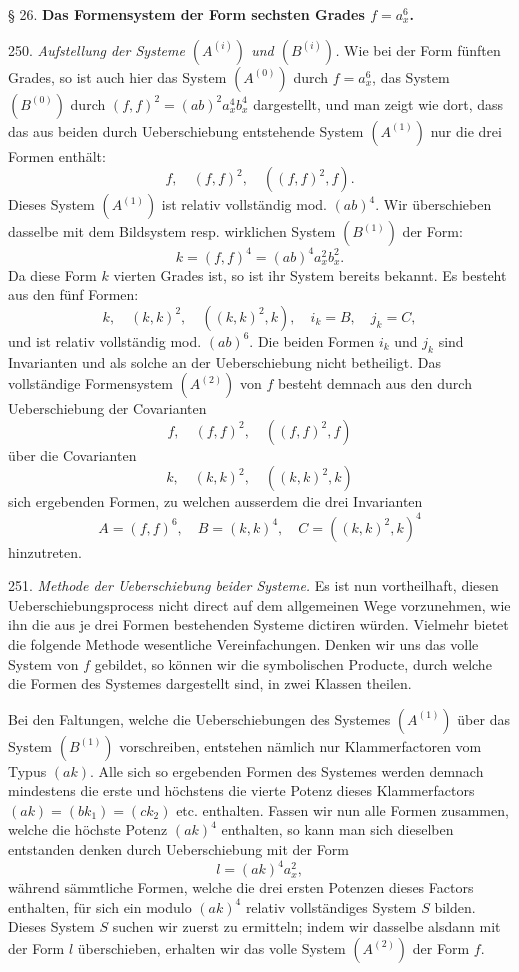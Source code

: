 § 26. \textbf{Das Formensystem der Form sechsten Grades $f = a_x^6$.}

250. \textit{Aufstellung der Systeme $(A^{(i)})$ und $(B^{(i)})$.} Wie bei
der Form fünften Grades, so ist auch hier das System $(A^{(0)})$ durch
$f = a_x^6$, das System $(B^{(0)})$ durch $(f,f)^2 = (ab)^2 a_x^4 b_x^4$
dargestellt, und man zeigt wie dort, dass das aus beiden durch
Ueberschiebung entstehende System $(A^{(1)})$ nur die drei Formen enthält:
\[
f,\quad (f,f)^2,\quad ((f,f)^2, f).
\]
Dieses System $(A^{(1)})$ ist relativ vollständig mod. $(ab)^4$. Wir
überschieben dasselbe mit dem Bildsystem resp. wirklichen System
$(B^{(1)})$ der Form:
\[
k = (f,f)^4 = (ab)^4 a_x^2 b_x^2 .
\]
Da diese Form $k$ vierten Grades ist, so ist ihr System bereits bekannt.
Es besteht aus den fünf Formen:
\[
k,\quad (k,k)^2,\quad ((k,k)^2, k),\quad i_k = B,\quad j_k = C,
\]
und ist relativ vollständig mod. $(ab)^6$. Die beiden Formen $i_k$ und
$j_k$ sind Invarianten und als solche an der Ueberschiebung nicht
betheiligt. Das vollständige Formensystem $(A^{(2)})$ von $f$ besteht
demnach aus den durch Ueberschiebung der Covarianten
\[
f,\quad (f,f)^2,\quad ((f,f)^2, f)
\]
über die Covarianten
\[
k,\quad (k,k)^2,\quad ((k,k)^2, k)
\]
sich ergebenden Formen, zu welchen ausserdem die drei Invarianten
\[
A = (f,f)^6,\quad B = (k,k)^4,\quad C = ((k,k)^2, k)^4
\]
hinzutreten.

251. \textit{Methode der Ueberschiebung beider Systeme.} Es ist nun
vortheilhaft, diesen Ueberschiebungsprocess nicht direct auf dem
allgemeinen Wege vorzunehmen, wie ihn die aus je drei Formen bestehenden
Systeme dictiren würden. Vielmehr bietet die folgende Methode wesentliche
Vereinfachungen. Denken wir uns das volle System von $f$ gebildet, so
können wir die symbolischen Producte, durch welche die Formen des
Systemes dargestellt sind, in zwei Klassen theilen.


Bei den Faltungen, welche die Ueberschiebungen des Systemes $(A^{(1)})$
über das System $(B^{(1)})$ vorschreiben, entstehen nämlich nur
Klammerfactoren vom Typus $(ak)$. Alle sich so ergebenden Formen des
Systemes werden demnach mindestens die erste und höchstens die vierte
Potenz dieses Klammerfactors $(ak) = (bk_1) = (ck_2)$ etc. enthalten.
Fassen wir nun alle Formen zusammen, welche die höchste Potenz $(ak)^4$
enthalten, so kann man sich dieselben entstanden denken durch
Ueberschiebung mit der Form
\[
l = (ak)^4 a_x^2,
\]
während sämmtliche Formen, welche die drei ersten Potenzen dieses
Factors enthalten, für sich ein modulo $(ak)^4$ relativ vollständiges
System $S$ bilden. Dieses System $S$ suchen wir zuerst zu ermitteln;
indem wir dasselbe alsdann mit der Form $l$ überschieben, erhalten wir
das volle System $(A^{(2)})$ der Form $f$.

